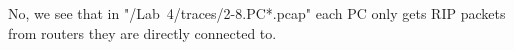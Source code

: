 No, we see that in "/Lab\ 4/traces/2-8.PC*.pcap" each PC only gets RIP packets from routers they are directly connected to.
